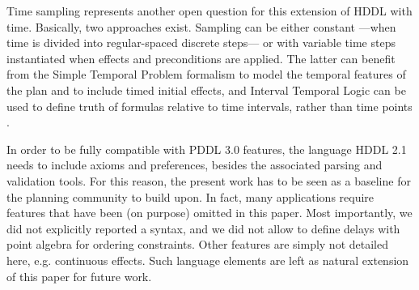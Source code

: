 \documentclass[letterpaper]{article} %
\begin{document}
Time sampling represents another open question for this extension of HDDL with time.
Basically, two approaches exist. Sampling can be either constant ---when time is divided into regular-spaced discrete steps--- or with variable time steps instantiated when effects and preconditions are applied. The latter can benefit from the Simple Temporal Problem formalism to model the temporal features of the plan and to include timed initial effects, and Interval Temporal Logic can be used to define truth of formulas relative to time intervals, rather than time points \citep{BRESOLIN2014269}.



In order to be fully compatible with PDDL 3.0 features, the language HDDL 2.1 needs to include axioms and preferences, besides the associated parsing and validation tools. For this reason, the present work has to be seen as a baseline for the planning community to build upon.
In fact, many applications require features that have been (on purpose) omitted in this paper. Most importantly, we did not explicitly reported a syntax, and we did not allow to define delays  with point algebra for ordering constraints. Other features are simply not detailed here, e.g. continuous effects.
Such language elements are left as natural extension of this paper for future work.




\end{document}
